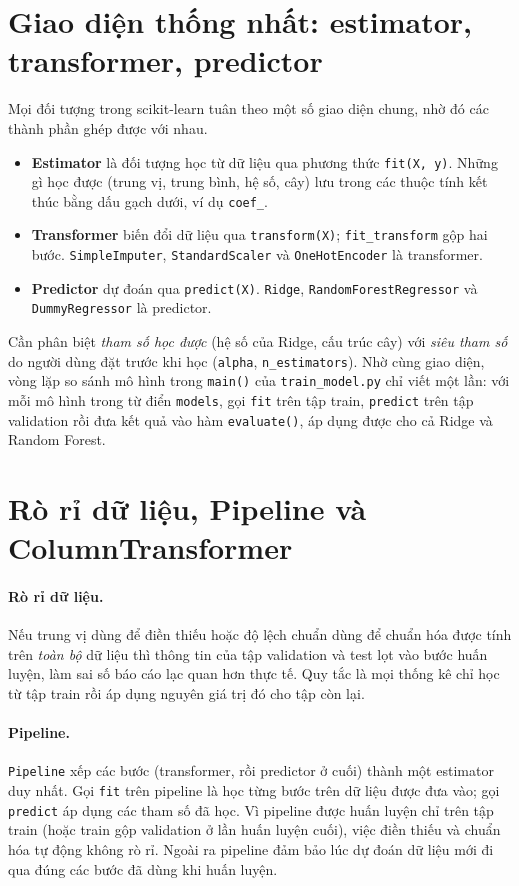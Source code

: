 \section{Giao diện thống nhất: estimator, transformer, predictor}\label{sec:api}
Mọi đối tượng trong scikit-learn tuân theo một số giao diện chung, nhờ đó các thành phần ghép được với nhau.
\begin{itemize}[nosep]
  \item \textbf{Estimator} là đối tượng học từ dữ liệu qua phương thức \texttt{fit(X, y)}. Những gì học được (trung vị, trung bình, hệ số, cây) lưu trong các thuộc tính kết thúc bằng dấu gạch dưới, ví dụ \texttt{coef\_}.
  \item \textbf{Transformer} biến đổi dữ liệu qua \texttt{transform(X)}; \texttt{fit\_transform} gộp hai bước. \texttt{SimpleImputer}, \texttt{StandardScaler} và \texttt{OneHotEncoder} là transformer.
  \item \textbf{Predictor} dự đoán qua \texttt{predict(X)}. \texttt{Ridge}, \texttt{RandomForest}\allowbreak\texttt{Regressor} và \texttt{DummyRegressor} là predictor.
\end{itemize}
Cần phân biệt \emph{tham số học được} (hệ số của Ridge, cấu trúc cây) với \emph{siêu tham số} do người dùng đặt trước khi học (\texttt{alpha}, \texttt{n\_estimators}). Nhờ cùng giao diện, vòng lặp so sánh mô hình trong \texttt{main()} của \texttt{train\_model.py} chỉ viết một lần: với mỗi mô hình trong từ điển \texttt{models}, gọi \texttt{fit} trên tập train, \texttt{predict} trên tập validation rồi đưa kết quả vào hàm \texttt{evaluate()}, áp dụng được cho cả Ridge và Random Forest.

\section{Rò rỉ dữ liệu, Pipeline và ColumnTransformer}\label{sec:pipeline}
\paragraph{Rò rỉ dữ liệu.} Nếu trung vị dùng để điền thiếu hoặc độ lệch chuẩn dùng để chuẩn hóa được tính trên \emph{toàn bộ} dữ liệu thì thông tin của tập validation và test lọt vào bước huấn luyện, làm sai số báo cáo lạc quan hơn thực tế. Quy tắc là mọi thống kê chỉ học từ tập train rồi áp dụng nguyên giá trị đó cho tập còn lại.

\paragraph{Pipeline.} \texttt{Pipeline} xếp các bước (transformer, rồi predictor ở cuối) thành một estimator duy nhất. Gọi \texttt{fit} trên pipeline là học từng bước trên dữ liệu được đưa vào; gọi \texttt{predict} áp dụng các tham số đã học. Vì pipeline được huấn luyện chỉ trên tập train (hoặc train gộp validation ở lần huấn luyện cuối), việc điền thiếu và chuẩn hóa tự động không rò rỉ. Ngoài ra pipeline đảm bảo lúc dự đoán dữ liệu mới đi qua đúng các bước đã dùng khi huấn luyện.

